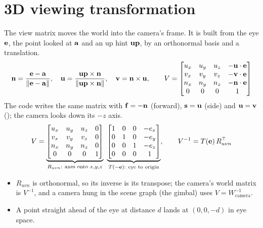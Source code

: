 \section{3D viewing transformation}
\label{sec:view}
The view matrix moves the world into the camera's frame. It is built from the eye $\mathbf{e}$, the point
looked at $\mathbf{a}$ and an up hint $\mathbf{up}$, by an orthonormal basis and a translation.
\begin{equation}
\mathbf{n}=\frac{\mathbf{e}-\mathbf{a}}{\lVert\mathbf{e}-\mathbf{a}\rVert},\quad
\mathbf{u}=\frac{\mathbf{up}\times\mathbf{n}}{\lVert\mathbf{up}\times\mathbf{n}\rVert},\quad
\mathbf{v}=\mathbf{n}\times\mathbf{u},\qquad
V=\begin{bmatrix}u_x&u_y&u_z&-\mathbf{u}\cdot\mathbf{e}\\v_x&v_y&v_z&-\mathbf{v}\cdot\mathbf{e}\\n_x&n_y&n_z&-\mathbf{n}\cdot\mathbf{e}\\0&0&0&1\end{bmatrix}
\label{eq:view}
\end{equation}
The code writes the same matrix with $\mathbf{f}=-\mathbf{n}$ (forward), $\mathbf{s}=\mathbf{u}$ (side) and $\mathbf{u}=\mathbf{v}$
(); the camera looks down its $-z$ axis.
\begin{equation}
V=\underbrace{\begin{bmatrix}u_x&u_y&u_z&0\\v_x&v_y&v_z&0\\n_x&n_y&n_z&0\\0&0&0&1\end{bmatrix}}_{R_{uvn}:\ \text{axes onto } x,y,z}\ 
\underbrace{\begin{bmatrix}1&0&0&-e_x\\0&1&0&-e_y\\0&0&1&-e_z\\0&0&0&1\end{bmatrix}}_{T(-\vect e):\ \text{eye to origin}},\qquad
V^{-1}=T(\vect e)\,R_{uvn}^{\top}\label{eq:viewdecomp}
\end{equation}
\begin{itemize}
\item $R_{uvn}$ is orthonormal, so its inverse is its transpose; the camera's world matrix is $V^{-1}$, and a camera hung in
the scene graph (the \ab{498}{UAV} gimbal) uses $V=W_{\text{camera}}^{-1}$.
\item A point straight ahead of the eye at distance $d$ lands at $(0,0,-d)$ in eye space.
\end{itemize}
